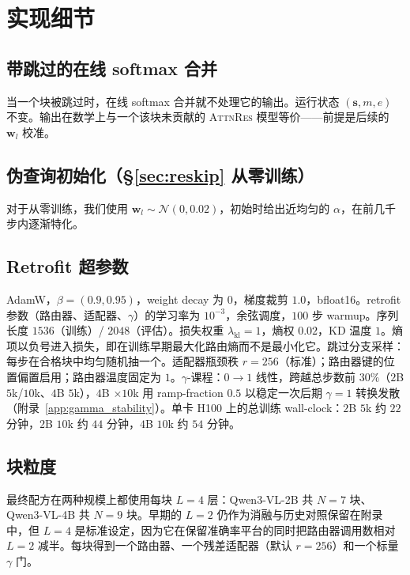 \documentclass{article}
\newcommand{\attnres}{\textsc{AttnRes}}
\begin{document}
\section{实现细节}
\label{app:implementation}

\subsection{带跳过的在线 softmax 合并}
当一个块被跳过时，在线 softmax 合并就不处理它的输出。运行状态 $(\mathbf{s}, m, e)$ 不变。输出在数学上与一个该块未贡献的 \attnres{} 模型等价——前提是后续的 $\mathbf{w}_l$ 校准。

\subsection{伪查询初始化（\S\ref{sec:reskip} 从零训练）}
对于从零训练，我们使用 $\mathbf{w}_l \sim \mathcal{N}(0, 0.02)$，初始时给出近均匀的 $\alpha$，在前几千步内逐渐特化。

\subsection{Retrofit 超参数}
\label{app:retrofit_hparams}
AdamW，$\beta{=}(0.9,0.95)$，weight decay 为 $0$，梯度裁剪 $1.0$，bfloat16。retrofit 参数（路由器、适配器、$\gamma$）的学习率为 $10^{-3}$，余弦调度，$100$ 步 warmup。序列长度 $1536$（训练）/ $2048$（评估）。损失权重 $\lambda_{\text{kl}}{=}1$，熵权 $0.02$，KD 温度 $1$。熵项以负号进入损失，即在训练早期最大化路由熵而不是最小化它。跳过分支采样：每步在合格块中均匀随机抽一个。适配器瓶颈秩 $r{=}256$（标准）；路由器键的位置偏置启用；路由器温度固定为 $1$。$\gamma$-课程：$0\to 1$ 线性，跨越总步数前 $30\%$（$2$B $5$k/$10$k、$4$B $5$k），$4$B $\times 10$k 用 ramp-fraction $0.5$ 以稳定一次后期 $\gamma{=}1$ 转换发散（附录~\ref{app:gamma_stability}）。单卡 H100 上的总训练 wall-clock：$2$B $5$k 约 $22$ 分钟，$2$B $10$k 约 $44$ 分钟，$4$B $10$k 约 $54$ 分钟。

\subsection{块粒度}
\label{app:block_granularity}
最终配方在两种规模上都使用每块 $L{=}4$ 层：Qwen3-VL-2B 共 $N{=}7$ 块、Qwen3-VL-4B 共 $N{=}9$ 块。早期的 $L{=}2$ 仍作为消融与历史对照保留在附录中，但 $L{=}4$ 是标准设定，因为它在保留准确率平台的同时把路由器调用数相对 $L{=}2$ 减半。每块得到一个路由器、一个残差适配器（默认 $r{=}256$）和一个标量 $\gamma$ 门。
\end{document}
